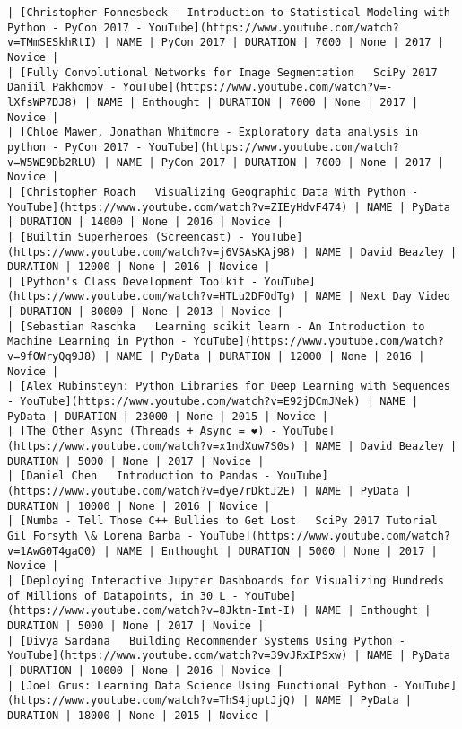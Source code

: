 \documentclass[11pt]{article}
\begin{document}
\begin{Verbatim}[commandchars=\\\{\}]
| [Christopher Fonnesbeck - Introduction to Statistical Modeling with Python - PyCon 2017 - YouTube](https://www.youtube.com/watch?v=TMmSESkhRtI) | NAME | PyCon 2017 | DURATION | 7000 | None | 2017 | Novice |
| [Fully Convolutional Networks for Image Segmentation   SciPy 2017   Daniil Pakhomov - YouTube](https://www.youtube.com/watch?v=-lXfsWP7DJ8) | NAME | Enthought | DURATION | 7000 | None | 2017 | Novice |
| [Chloe Mawer, Jonathan Whitmore - Exploratory data analysis in python - PyCon 2017 - YouTube](https://www.youtube.com/watch?v=W5WE9Db2RLU) | NAME | PyCon 2017 | DURATION | 7000 | None | 2017 | Novice |
| [Christopher Roach   Visualizing Geographic Data With Python - YouTube](https://www.youtube.com/watch?v=ZIEyHdvF474) | NAME | PyData | DURATION | 14000 | None | 2016 | Novice |
| [Builtin Superheroes (Screencast) - YouTube](https://www.youtube.com/watch?v=j6VSAsKAj98) | NAME | David Beazley | DURATION | 12000 | None | 2016 | Novice |
| [Python's Class Development Toolkit - YouTube](https://www.youtube.com/watch?v=HTLu2DFOdTg) | NAME | Next Day Video | DURATION | 80000 | None | 2013 | Novice |
| [Sebastian Raschka   Learning scikit learn - An Introduction to Machine Learning in Python - YouTube](https://www.youtube.com/watch?v=9fOWryQq9J8) | NAME | PyData | DURATION | 12000 | None | 2016 | Novice |
| [Alex Rubinsteyn: Python Libraries for Deep Learning with Sequences - YouTube](https://www.youtube.com/watch?v=E92jDCmJNek) | NAME | PyData | DURATION | 23000 | None | 2015 | Novice |
| [The Other Async (Threads + Async = ❤️) - YouTube](https://www.youtube.com/watch?v=x1ndXuw7S0s) | NAME | David Beazley | DURATION | 5000 | None | 2017 | Novice |
| [Daniel Chen   Introduction to Pandas - YouTube](https://www.youtube.com/watch?v=dye7rDktJ2E) | NAME | PyData | DURATION | 10000 | None | 2016 | Novice |
| [Numba - Tell Those C++ Bullies to Get Lost   SciPy 2017 Tutorial   Gil Forsyth \& Lorena Barba - YouTube](https://www.youtube.com/watch?v=1AwG0T4gaO0) | NAME | Enthought | DURATION | 5000 | None | 2017 | Novice |
| [Deploying Interactive Jupyter Dashboards for Visualizing Hundreds of Millions of Datapoints, in 30 L - YouTube](https://www.youtube.com/watch?v=8Jktm-Imt-I) | NAME | Enthought | DURATION | 5000 | None | 2017 | Novice |
| [Divya Sardana   Building Recommender Systems Using Python - YouTube](https://www.youtube.com/watch?v=39vJRxIPSxw) | NAME | PyData | DURATION | 10000 | None | 2016 | Novice |
| [Joel Grus: Learning Data Science Using Functional Python - YouTube](https://www.youtube.com/watch?v=ThS4juptJjQ) | NAME | PyData | DURATION | 18000 | None | 2015 | Novice |

\end{Verbatim}
\end{document}
